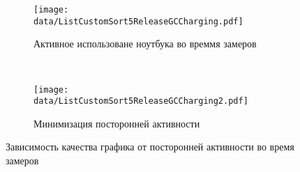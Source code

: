 \begin{figure}
	\centering
	\begin{subfigure}[b]{0.48\textwidth}
       \centering
	   \texttt{[image: data/ListCustomSort5ReleaseGCCharging.pdf]}
	   \caption{Активное использоване ноутбука во времмя замеров}
	   \label{fig:list_sort_5_trash}
	\end{subfigure}~
	\begin{subfigure}[b]{0.48\textwidth}
       \centering
	   \texttt{[image: data/ListCustomSort5ReleaseGCCharging2.pdf]}
	   \caption{Минимизация посторонней активности}
	   \label{fig:list_sort_5_clean}
	\end{subfigure}
	\caption{Зависимость качества графика от посторонней активности во время замеров}
	\label{fig:quality_of_measurements}	
\end{figure}
